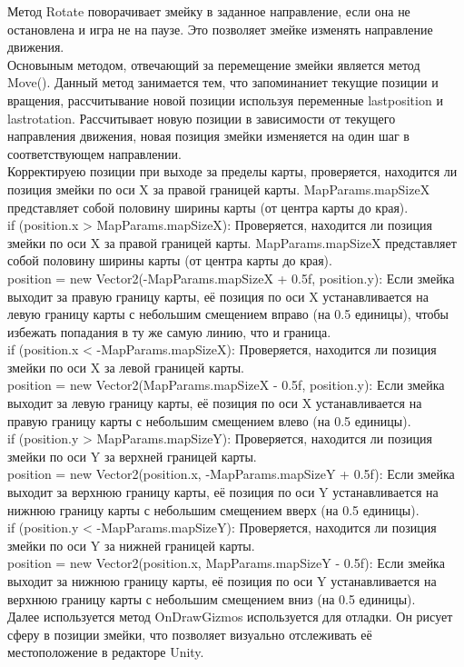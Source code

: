 Метод Rotate поворачивает змейку в заданное направление, если она не остановлена и игра не на паузе. Это позволяет змейке изменять направление движения.\\
Основыным методом, отвечающий за перемещение змейки является метод Move(). Данный метод занимается тем, что запоминаниет текущие позиции и вращения, рассчитывание новой позиции используя переменные lastposition и lastrotation. Рассчитывает новую позиции в зависимости от текущего направления движения, новая позиция змейки изменяется на один шаг в соответствующем направлении.\\
Корректируею позиции при выходе за пределы карты, проверяется, находится ли позиция змейки по оси X за правой границей карты. MapParams.mapSizeX представляет собой половину ширины карты (от центра карты до края).\\
if (position.x > MapParams.mapSizeX): Проверяется, находится ли позиция змейки по оси X за правой границей карты. MapParams.mapSizeX представляет собой половину ширины карты (от центра карты до края).\\
position = new Vector2(-MapParams.mapSizeX + 0.5f, position.y): Если змейка выходит за правую границу карты, её позиция по оси X устанавливается на левую границу карты с небольшим смещением вправо (на 0.5 единицы), чтобы избежать попадания в ту же самую линию, что и граница.\\
if (position.x < -MapParams.mapSizeX): Проверяется, находится ли позиция змейки по оси X за левой границей карты.\\
position = new Vector2(MapParams.mapSizeX - 0.5f, position.y): Если змейка выходит за левую границу карты, её позиция по оси X устанавливается на правую границу карты с небольшим смещением влево (на 0.5 единицы).\\
if (position.y > MapParams.mapSizeY): Проверяется, находится ли позиция змейки по оси Y за верхней границей карты.\\
position = new Vector2(position.x, -MapParams.mapSizeY + 0.5f): Если змейка выходит за верхнюю границу карты, её позиция по оси Y устанавливается на нижнюю границу карты с небольшим смещением вверх (на 0.5 единицы).\\
if (position.y < -MapParams.mapSizeY): Проверяется, находится ли позиция змейки по оси Y за нижней границей карты.\\
position = new Vector2(position.x, MapParams.mapSizeY - 0.5f): Если змейка выходит за нижнюю границу карты, её позиция по оси Y устанавливается на верхнюю границу карты с небольшим смещением вниз (на 0.5 единицы).\\
Далее используется метод OnDrawGizmos используется для отладки. Он рисует сферу в позиции змейки, что позволяет визуально отслеживать её местоположение в редакторе Unity.
